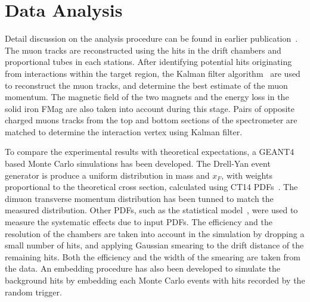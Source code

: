 \documentclass[reprint,aps,unsortedaddress,superscriptaddress,prl,floatfix,showpacs,linenumbers,final]{revtex4-2}
\begin{document}
\section{Data Analysis}
\label{sec:analysis}
Detail discussion on the analysis procedure can be found in earlier publication~\cite{dove2021,dove2023}.
The muon tracks are reconstructed using the hits in the drift chambers and proportional tubes in each stations. 
After identifying potential hits originating from interactions within the target region,
the Kalman filter algorithm~\cite{kalman1960} are used to reconstruct the muon tracks,
and determine the best estimate of the muon momentum.
The magnetic field of the two magnets and the energy loss in the solid iron FMag are also taken into account during this stage.
Pairs of opposite charged muons tracks from the top and bottom sections of the spectrometer are
matched to determine the interaction vertex using Kalman filter.

To compare the experimental results with theoretical expectations,
a GEANT4~\cite{agostinelli2003,allison2006,allison2016} based Monte Carlo simulations has been developed.
The Drell-Yan event generator is produce a uniform distribution in mass and $x_F$,
with weights proportional to the theoretical cross section, calculated using CT14 PDFs~\cite{hou2018}.
The dimuon transverse momentum distribution has been tunned to match the measured distribution.
Other PDFs, such as the statistical model~\cite{soffer2019}, were used to measure the systematic effects due to input PDFs.
The efficiency and the resolution of the chambers are taken into account in the simulation
by dropping a small number of hits, and applying Gaussian smearing to the drift distance of the remaining hits.
Both the efficiency and the width of the smearing are taken from the data.
An embedding procedure has also been developed to simulate the background hits by embedding each Monte Carlo events
with hits recorded by the random trigger.
\end{document}
